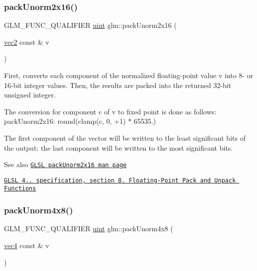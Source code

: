 \subsubsection{\texorpdfstring{pack\+Unorm2x16()}{packUnorm2x16()}}
{\footnotesize\ttfamily G\+L\+M\+\_\+\+F\+U\+N\+C\+\_\+\+Q\+U\+A\+L\+I\+F\+I\+ER \hyperlink{group__core__precision_ga4fd29415871152bfb5abd588334147c8}{uint} glm\+::pack\+Unorm2x16 (\begin{DoxyParamCaption}\item[{\hyperlink{group__core__types_gaa1618f51db67eaa145db101d8c8431d8}{vec2} const \&}]{v }\end{DoxyParamCaption})}

First, converts each component of the normalized floating-\/point value v into 8-\/ or 16-\/bit integer values. Then, the results are packed into the returned 32-\/bit unsigned integer.

The conversion for component c of v to fixed point is done as follows\+: pack\+Unorm2x16\+: round(clamp(c, 0, +1) $\ast$ 65535.)

The first component of the vector will be written to the least significant bits of the output; the last component will be written to the most significant bits.

\begin{DoxySeeAlso}{See also}
\href{http://www.opengl.org/sdk/docs/manglsl/xhtml/packUnorm2x16.xml}{\tt G\+L\+SL pack\+Unorm2x16 man page} 

\href{http://www.opengl.org/registry/doc/GLSLangSpec.4.20.8.pdf}{\tt G\+L\+SL 4.. specification, section 8. Floating-\/\+Point Pack and Unpack Functions} 
\end{DoxySeeAlso}
\mbox{\label{group__core__func__packing_ga834ee9a9e73dcb0a7c1fc88143f3edb8}} 
\subsubsection{\texorpdfstring{pack\+Unorm4x8()}{packUnorm4x8()}}
{\footnotesize\ttfamily G\+L\+M\+\_\+\+F\+U\+N\+C\+\_\+\+Q\+U\+A\+L\+I\+F\+I\+ER \hyperlink{group__core__precision_ga4fd29415871152bfb5abd588334147c8}{uint} glm\+::pack\+Unorm4x8 (\begin{DoxyParamCaption}\item[{\hyperlink{group__core__types_ga5881b1b022d7fd1b7218f5916532dd02}{vec4} const \&}]{v }\end{DoxyParamCaption})}

